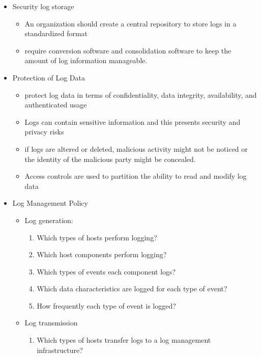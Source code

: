 \documentclass{article}
\begin{document}
\begin{itemize}
\begin{itemize}
\begin{itemize}
            \item Security log storage
            \begin{itemize}
                \item An organization should create a central repository to store logs in a standardized format
                \item require conversion software and consolidation software to keep the amount of log information manageable.
            \end{itemize}
            \item Protection of Log Data
            \begin{itemize}
                \item  protect log data in terms of confidentiality, data integrity, availability, and authenticated usage
                \item Logs can contain sensitive information and this presents security and privacy risks
                \item if logs are altered or deleted, malicious activity might not be noticed or the identity of the malicious party might be concealed.
                \item Access controls are used to partition the ability to read and modify log data
            \end{itemize}
            \item Log Management Policy
            \begin{itemize}
                \item Log generation: 
                \begin{enumerate}
                    \item Which types of hosts perform logging?
                    \item Which host components perform logging?
                    \item Which types of events each component logs?
                    \item Which data characteristics are logged for each type of event?
                    \item How frequently each type of event is logged?
                \end{enumerate}
                \item Log transmission
                \begin{enumerate}
                    \item Which types of hosts transfer logs to a log management infrastructure?

\end{enumerate}
\end{itemize}
\end{itemize}
\end{itemize}
\end{itemize}
\end{document}
